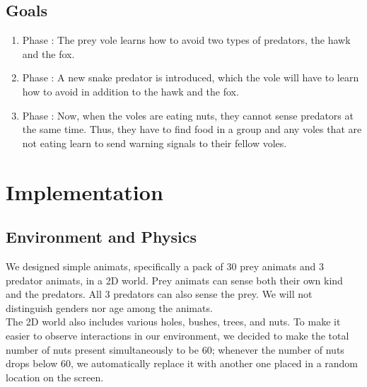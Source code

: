 \documentclass[10pt,conference,letterpaper,doublecolumn]{IEEEtran}
\begin{document}
\subsection{Goals}
\begin{enumerate}
\item Phase \uppercase\expandafter{}: The prey vole learns how to avoid two types of predators, the hawk and the fox. \\
\item Phase \uppercase\expandafter{}: A new snake predator is introduced, which the vole will have to learn how to avoid in addition to the hawk and the fox. \\
\item Phase \uppercase\expandafter{}: Now, when the voles are eating nuts, they cannot sense predators at the same time. Thus, they have to find food in a group and any voles that are not eating learn to send warning signals to their fellow voles.
\end{enumerate}
\section{Implementation}
\subsection{Environment and Physics}
We designed simple animats, specifically a pack of 30 prey animats and 3 predator animats, in a 2D world. Prey animats can sense both their own kind and the predators. All 3 predators can also sense the prey. We will not distinguish genders nor age among the animats. \\

The 2D world also includes various holes, bushes, trees, and nuts. To make it easier to observe interactions in our environment, we decided to make the total number of nuts present simultaneously to be 60; whenever the number of nuts drops below 60, we automatically replace it with another one placed in a random location on the screen.
\end{document}
